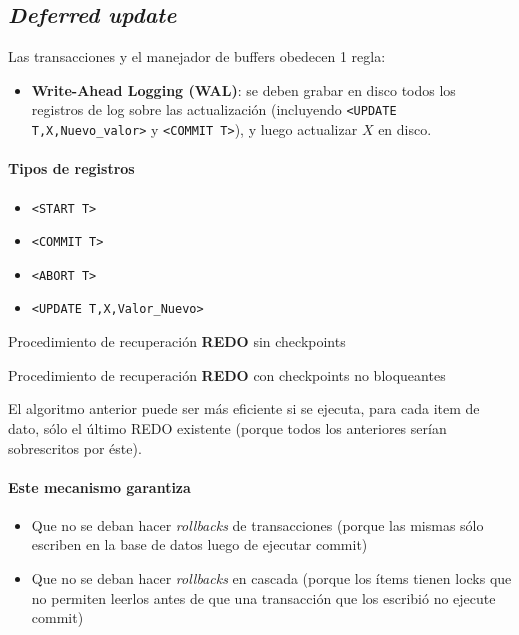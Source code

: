 \documentclass[a4paper, twoside]{article}
\newcommand{\codedir}{../resources/code} %
\begin{document}
\subsection{\emph{Deferred update}}
Las transacciones y el manejador de buffers obedecen 1 regla:
\begin{itemize}
	\item \textbf{Write-Ahead Logging (WAL)}: se deben grabar en disco todos los registros de log sobre las actualización (incluyendo \texttt{<UPDATE T,X,Nuevo\_valor>} y \texttt{<COMMIT T>}), y luego actualizar $X$ en disco.
\end{itemize}

\paragraph{Tipos de registros}
\begin{itemize}
	\item \texttt{<START T>}
	\item \texttt{<COMMIT T>}
	\item \texttt{<ABORT T>}
	\item \texttt{<UPDATE T,X,Valor\_Nuevo>}
\end{itemize}

\begin{algorithm}[H]
	
	\caption{Procedimiento de recuperación \textbf{REDO} sin checkpoints}
\end{algorithm}

\begin{algorithm}[H]
	
	\caption{Procedimiento de recuperación \textbf{REDO} con checkpoints no bloqueantes}
\end{algorithm}

El algoritmo anterior puede ser más eficiente si se ejecuta, para cada item de dato, sólo el último REDO existente (porque todos los anteriores serían sobrescritos por éste).

\paragraph{Este mecanismo garantiza}
\begin{itemize}
	\item Que no se deban hacer \emph{rollbacks} de transacciones (porque las mismas sólo escriben en la base de datos luego de ejecutar commit)
	\item Que no se deban hacer \emph{rollbacks} en cascada (porque los ítems tienen locks que no permiten leerlos antes de que una transacción que los escribió no ejecute commit)
\end{itemize}
\end{document}
